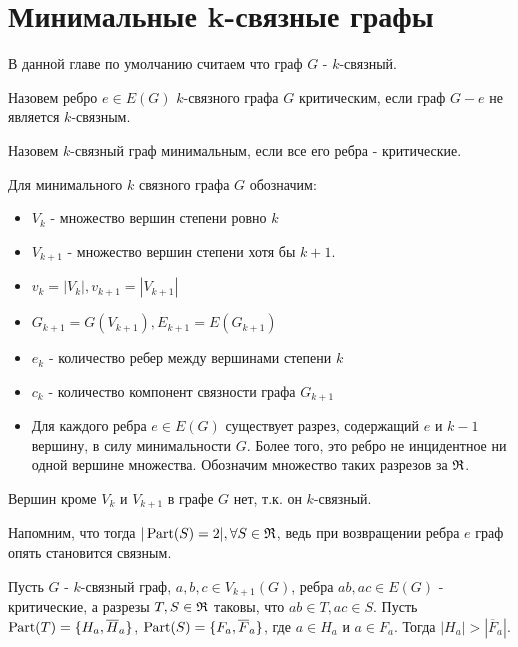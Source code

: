 
\section{Минимальные k-связные графы}

В данной главе по умолчанию считаем что граф $G$ -  $k$-связный. 

\begin{df}
	Назовем ребро $e \in E(G)$ $k$-связного графа  $G$ критическим, если граф  $G - e$ не является  $k$-связным.
\end{df}

\begin{df}
	Назовем $k$-связный граф минимальным, если все его ребра - критические.
\end{df}

\begin{prop} \label{prop:for_minimum_k_connected_graph}
	Для минимального $k$ связного графа  $G$ обозначим:
	 \begin{itemize}
		 \item $V_k$ - множество вершин степени ровно  $k$
		 \item  $V_{k +1}$ - множество вершин степени хотя бы  $k + 1$. 
		 \item $v_k = |V_k|, v_{k + 1} = |V_{k + 1}|$
		 \item  $G_{k+1} = G(V_{k + 1}), E_{k + 1} = E(G_{k + 1})$
		\item  $e_k$ - количество ребер между вершинами степени  $k$
		\item $c_k$ - количество компонент связности графа  $G_{k + 1}$
		\item Для каждого ребра  $e \in E(G)$ существует разрез, содержащий  $e$ и  $k - 1$ вершину, в силу минимальности $G$. Более того, это ребро не инцидентное ни одной вершине множества.
			Обозначим множество таких разрезов за  $\mathfrak{R}$.
	\end{itemize}

	Вершин кроме $V_k$ и  $V_{k+1}$ в графе  $G$ нет, т.к. он  $k$-связный.
\end{prop}

Напомним, что тогда $|\operatorname{Part}(S) = 2|, \forall S \in \mathfrak{R}$, ведь при возвращении ребра  $e$ граф опять становится связным.

\begin{lm} \label{lemma:3_1}
	Пусть $G$ -  $k$-связный граф,  $a, b, c \in V_{k + 1}(G)$, ребра  $ab, ac \in E(G)$ - критические, а разрезы  $T, S \in \mathfrak{R}$ таковы, что $ab \in T, ac \in S$.
	Пусть  $\operatorname{Part}(T) = \{H_a, \overline H_a\}$,  $\operatorname{Part}(S) = \{F_a, \overline F_a\}$, где  $a \in H_a$ и  $a \in F_a$.
		Тогда  $|H_a| > |\overline F_a|$.
\end{lm}

